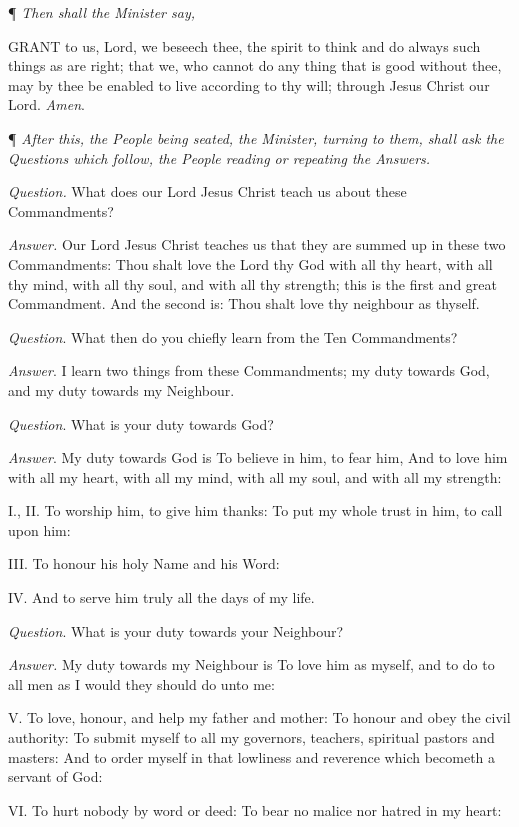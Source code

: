 ¶
\emph{Then shall the Minister say,}

GRANT
to us, Lord, we beseech thee, the spirit to think and do always such things
as are right; that we, who cannot do any thing that is good without thee,
may by thee be enabled to live according to thy will; through Jesus Christ
our Lord. \emph{Amen}.

¶
\emph{After this, the People being seated, the Minister, turning to them,
shall ask the Questions which follow, the People reading or repeating
the Answers.}

\emph{Question.} What does our Lord Jesus Christ teach us about these
Commandments?

\emph{Answer.} Our Lord Jesus Christ teaches us that
they are summed up in these two Commandments: Thou shalt love the Lord
thy God with all thy heart, with all thy mind, with all thy soul, and
with all thy strength; this is the first and great Commandment. And the
second is: Thou shalt love thy neighbour as thyself.

\emph{Question}. What then do you chiefly learn from
the Ten Commandments?

\emph{Answer}. I learn two things from these Commandments;
my duty towards God, and my duty towards my Neighbour.

\emph{Question}. What is your duty towards God?

\emph{Answer}. My duty towards God is To believe
in him, to fear him, And to love him with all my heart, with all my mind,
with all my soul, and with all my strength:

I., II. To worship him, to give him thanks: To put my whole trust in him,
to call upon him:

III. To honour his holy Name and his Word:

IV. And to serve him truly all the days of my life.

\emph{Question}. What is your duty towards your Neighbour?

\emph{Answer.} My duty towards my Neighbour is To
love him as myself, and to do to all men as I would they should do unto
me:

V. To love, honour, and help my father and mother: To honour and obey
the civil authority: To submit myself to all my governors, teachers, spiritual
pastors and masters: And to order myself in that lowliness and reverence
which becometh a servant of God:

VI. To hurt nobody by word or deed: To bear no malice
nor hatred in my heart:

